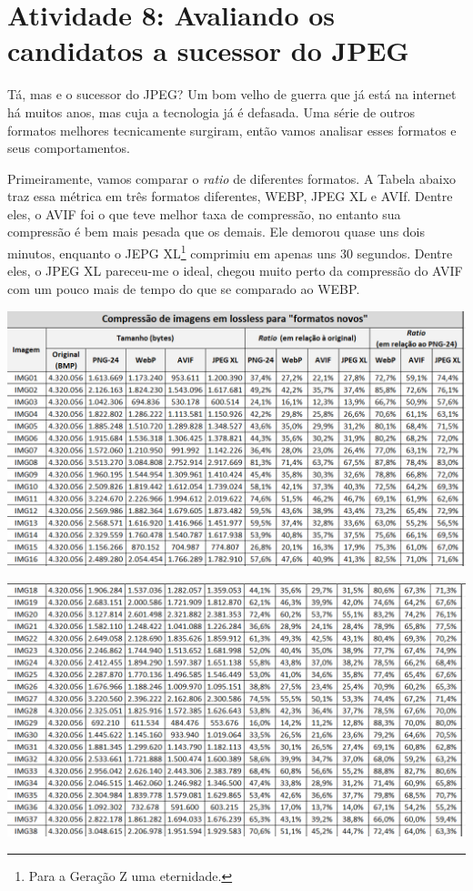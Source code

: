 \captionsetup{justification=centering,margin=0cm}
\label{cap:atividade8}  %

\chapter[Atividade8: Avaliando os candidatos a sucessor do JPEG]{Atividade 8: Avaliando os candidatos a sucessor do JPEG}

Tá, mas e o sucessor do JPEG? Um bom velho de guerra que já está na internet há muitos anos, mas cuja a tecnologia já é defasada. Uma série de outros formatos melhores tecnicamente surgiram, então vamos analisar esses formatos e seus comportamentos.

\paragrafo Primeiramente, vamos comparar o \textit{ratio} de diferentes formatos. A Tabela abaixo traz essa métrica em três formatos diferentes, WEBP, JPEG XL e AVIf. Dentre eles, o AVIF foi o que teve melhor taxa de compressão, no entanto sua compressão é bem mais pesada que os demais. Ele demorou quase uns dois minutos, enquanto o JEPG XL\footnote{Para a Geração Z uma eternidade.} comprimiu em apenas uns 30 segundos. Dentre eles, o JPEG XL pareceu-me o ideal, chegou muito perto da compressão do AVIF com um pouco mais de tempo do que se comparado ao WEBP.

\includegraphics[scale=0.6]{Documeto/1-ElementosTextuais/1-Desenvolvimento/2.png}

\includegraphics[scale=0.6]{Documeto/1-ElementosTextuais/1-Desenvolvimento/3.png}


